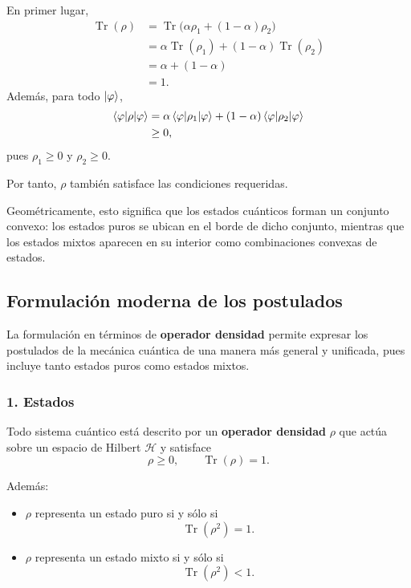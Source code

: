 \documentclass[12pt,a4paper]{article}
\theoremstyle{definition}
\theoremstyle{plain}
\theoremstyle{remark}
\begin{document}
En primer lugar,
\begin{align*}
    \operatorname{Tr}(\rho)
    &= \operatorname{Tr}\bigl(\alpha \rho_1 + (1-\alpha)\rho_2\bigr) \\
    &= \alpha \operatorname{Tr}(\rho_1) + (1-\alpha)\operatorname{Tr}(\rho_2) \\
    &= \alpha + (1-\alpha) \\
    &= 1.
\end{align*}
Además, para todo $\ket{\varphi}$,
\begin{align*}
    \braket{\varphi|\rho|\varphi}
    &= \alpha \braket{\varphi|\rho_1|\varphi}
    + (1-\alpha)\braket{\varphi|\rho_2|\varphi} \\
    &\geq 0,
\end{align*}
pues $\rho_1\geq 0$ y $\rho_2\geq 0$.

Por tanto, $\rho$ también satisface las condiciones requeridas.

Geométricamente, esto significa que los estados cuánticos forman un conjunto convexo: los estados puros se ubican en el borde de dicho conjunto, mientras que los estados mixtos aparecen en su interior como combinaciones convexas de estados.

\subsection{Formulación moderna de los postulados}

La formulación en términos de \textbf{operador densidad} permite expresar los postulados de la mecánica cuántica de una manera más general y unificada, pues incluye tanto estados puros como estados mixtos.

\subsubsection*{1. Estados}

Todo sistema cuántico está descrito por un \textbf{operador densidad} $\rho$ que actúa sobre un espacio de Hilbert $\mathcal{H}$ y satisface
\begin{equation*}
    \rho \geq 0,
    \qquad
    \operatorname{Tr}(\rho)=1.
\end{equation*}

Además:
\begin{itemize}
    \item $\rho$ representa un estado puro si y sólo si
    \begin{equation*}
        \operatorname{Tr}(\rho^2)=1.
    \end{equation*}

    \item $\rho$ representa un estado mixto si y sólo si
    \begin{equation*}
        \operatorname{Tr}(\rho^2)<1.
    \end{equation*}
\end{itemize}
\end{document}
